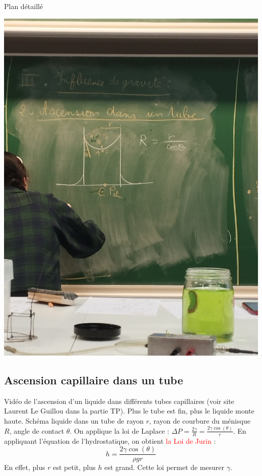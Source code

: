 \begin{reportBlock}{Plan détaillé}
\begin{center}
      \includegraphics[scale=0.1]{LP_TensionSurface/Menisque.jpg}
  \end{center}

  \subsection{Ascension capillaire dans un tube}
  Vidéo de l'ascension d'un liquide dans différents tubes capillaires (voir site Laurent Le Guillou dans la partie TP). Plus le tube est fin, plus le liquide monte haute.
  Schéma liquide dans un tube de rayon $r$, rayon de courbure du ménisque $R$, angle de contact $\theta$. On applique la loi de Laplace : $\Delta P = \frac{2\gamma}{R}=\frac{2\gamma\cos(\theta)}{r}$. En appliquant l'équation de l'hydrostatique, on obtient \textcolor{red}{la Loi de Jurin} :
  \begin{equation}
      h = \frac{2\gamma\cos(\theta)}{\rho g r}
  \end{equation}
  En effet, plus $r$ est petit, plus $h$ est grand. Cette loi permet de mesurer $\gamma$.


\end{reportBlock}
